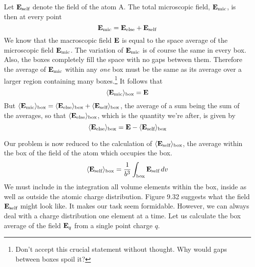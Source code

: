 Let $\mathbf{E}_\text{self}$ denote the field of the atom A. The total microscopic
field, $\mathbf{E}_\text{mic}$, is then at every point
\begin{equation}
  \mathbf{E}_\text{mic} = \mathbf{E}_\text{else} + \mathbf{E}_\text{self}
\end{equation}
We know that the macroscopic field $\mathbf{E}$ is equal to the space average
of the microscopic field $\mathbf{E}_\text{mic}$. The variation of $\mathbf{E}_\text{mic}$ is of course the
same in every box. Also, the boxes completely fill the space with
no gaps between them. Therefore the average of $\mathbf{E}_\text{mic}$ within any
\emph{one} box must be the same as its average over a larger region containing
many boxes.\footnote{Don't accept this crucial statement without thought. Why would gaps between
boxes spoil it?} It follows that
\begin{equation}
  \langle\mathbf{E}_\text{mic}\rangle_\text{box} = \mathbf{E}
\end{equation}
But $\langle\mathbf{E}_\text{mic}\rangle_\text{box}
=\langle\mathbf{E}_\text{else}\rangle_\text{box}+\langle\mathbf{E}_\text{self}\rangle_\text{box}$,
the average of a sum being
the sum of the averages, so that $\langle\mathbf{E}_\text{else}\rangle_\text{box}$, which is the quantity we're
after, is given by
\begin{equation}
  \langle\mathbf{E}_\text{else}\rangle_\text{box} = \mathbf{E} - \langle\mathbf{E}_\text{self}\rangle_\text{box}
\end{equation}

Our problem is now reduced to the calculation of $\langle\mathbf{E}_\text{self}\rangle_\text{box}$, the
average within the box of the field of the atom which occupies the
box.
\begin{equation}
  \langle\mathbf{E}_\text{self}\rangle_\text{box} = \frac{1}{b^3}\int_\text{box} \mathbf{E}_\text{self}\mathop{d\!} v
\end{equation}
We must include in the integration all volume elements within the
box, inside as well as outside the atomic charge distribution. Figure
9.32 suggests what the field $\mathbf{E}_\text{self}$ might look like. It makes our task
seem formidable. However, we can always deal with a charge distribution
one element at a time. Let us calculate the box average
of the field $\mathbf{E}_q$ from a single point charge $q$.

